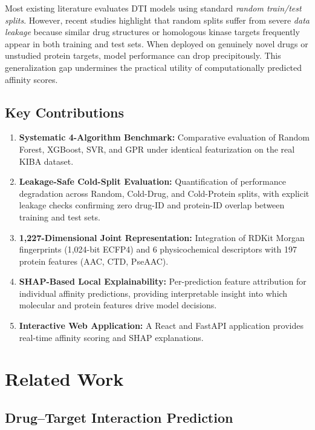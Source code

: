 \documentclass[10pt,conference]{IEEEtran}
\begin{document}
Most existing literature evaluates DTI models using standard \emph{random train/test splits}. However, recent studies highlight that random splits suffer from severe \emph{data leakage} because similar drug structures or homologous kinase targets frequently appear in both training and test sets. When deployed on genuinely novel drugs or unstudied protein targets, model performance can drop precipitously. This generalization gap undermines the practical utility of computationally predicted affinity scores.

\subsection{Key Contributions}

\begin{enumerate}[label=\textbf{\arabic*.}, leftmargin=*, itemsep=0pt]
    \item \textbf{Systematic 4-Algorithm Benchmark:} Comparative evaluation of Random Forest, XGBoost, SVR, and GPR under identical featurization on the real KIBA dataset.
    \item \textbf{Leakage-Safe Cold-Split Evaluation:} Quantification of performance degradation across Random, Cold-Drug, and Cold-Protein splits, with explicit leakage checks confirming zero drug-ID and protein-ID overlap between training and test sets.
    \item \textbf{1,227-Dimensional Joint Representation:} Integration of RDKit Morgan fingerprints (1,024-bit ECFP4) and 6 physicochemical descriptors with 197 protein features (AAC, CTD, PseAAC).
    \item \textbf{SHAP-Based Local Explainability:} Per-prediction feature attribution for individual affinity predictions, providing interpretable insight into which molecular and protein features drive model decisions.
    \item \textbf{Interactive Web Application:} A React and FastAPI application provides real-time affinity scoring and SHAP explanations.
\end{enumerate}

\section{Related Work}
\label{sec:related}

\subsection{Drug--Target Interaction Prediction}
\end{document}
